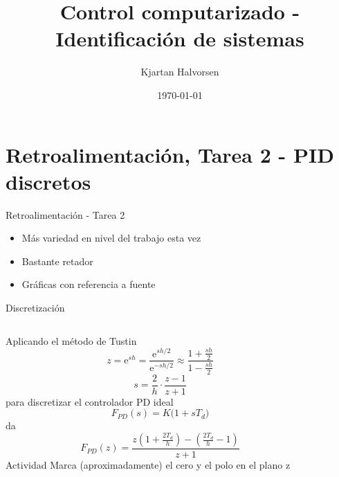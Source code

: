 \documentclass[presentation,aspectratio=169]{beamer}
\author{Kjartan Halvorsen}
\date{\today}
\title{Control computarizado - Identificación de sistemas}
\begin{document}
\maketitle

\section{Retroalimentación, Tarea 2 - PID discretos}
\label{sec:org5ac4a57}

\begin{frame}[label={sec:org9fd1329}]{Retroalimentación -  Tarea 2}
\begin{itemize}
\item Más variedad en nivel del trabajo esta vez
\item Bastante retador
\item Gráficas con referencia a fuente
\end{itemize}
\end{frame}

\begin{frame}[label={sec:orgd41e4ae}]{Discretización}
\begin{columns}
\begin{column}{0.65\columnwidth}
Aplicando el método de Tustin
\[ z = \mathrm{e}^{sh} = \frac{\mathrm{e}^{sh/2}}{\mathrm{e}^{-sh/2}} \approx \frac{ 1 + \frac{sh}{2}}{1 - \frac{sh}{2}}\]
\[ s = \frac{2}{h} \cdot \frac{z-1}{z+1}\]
para discretizar el controlador PD ideal
\[F_{PD}(s) = K\big(1 + sT_d\big)\]
da
\[ F_{PD}(z) = \frac{z(1 + \frac{2T_d}{h}) - (\frac{2T_d}{h}-1)}{z + 1}\]
\alert{Actividad} Marca (aproximadamente) el cero y el polo en el plano z 
\end{column}
\begin{column}{0.35\columnwidth}
\begin{center}
\end{center}
\end{column}
\end{columns}
\end{frame}
\end{document}
